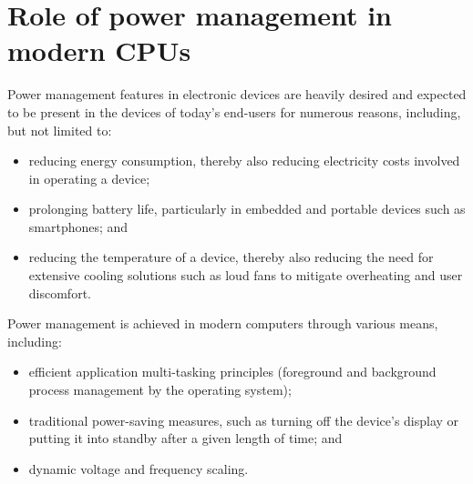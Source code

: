 \section{Role of power management in modern CPUs}

Power management features in electronic devices are heavily desired and expected
to be present in the devices of today's end-users for numerous reasons,
including, but not limited to:

\begin{itemize}
    \item reducing energy consumption, thereby also reducing electricity costs
        involved in operating a device;
    \item prolonging battery life, particularly in embedded and portable
        devices such as smartphones; and
    \item reducing the temperature of a device, thereby also reducing the need
        for extensive cooling solutions such as loud fans to mitigate
        overheating and user discomfort.
\end{itemize}

Power management is achieved in modern computers through various means,
including:

\begin{itemize}
    \item efficient application multi-tasking principles (foreground and
        background process management by the operating system);
    \item traditional power-saving measures, such as turning off the device's
        display or putting it into standby after a given length of time; and
    \item dynamic voltage and frequency scaling.
\end{itemize}

